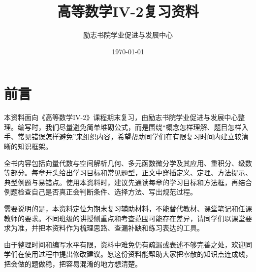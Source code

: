 \documentclass[a4paper,10pt]{ctexart}
\begin{document}

\title{高等数学IV-2复习资料}
\author{励志书院\quad 学业促进与发展中心}
\date{\today}
\maketitle

\tableofcontents

\newpage
\section*{\huge\textbf{前言}}

本资料面向《高等数学IV-2》课程期末复习，由励志书院学业促进与发展中心整理。编写时，我们尽量避免简单堆砌公式，而是围绕“概念怎样理解、题目怎样入手、常见错误怎样避免”来组织内容，希望帮助同学们在有限复习时间内建立较清晰的知识框架。

全书内容包括向量代数与空间解析几何、多元函数微分学及其应用、重积分、级数等部分。每章开头给出学习目标和常见题型，正文中穿插定义、定理、方法提示、典型例题与易错点。使用本资料时，建议先通读每章的学习目标和方法框，再结合例题检查自己是否真正会判断条件、选择方法、写出规范过程。

需要说明的是，本资料定位为期末复习辅助材料，不能替代教材、课堂笔记和任课教师的要求。不同班级的讲授侧重点和考查范围可能存在差异，请同学们以课堂要求为准，并把本资料作为梳理思路、查漏补缺和练习表达的工具。

由于整理时间和编写水平有限，资料中难免仍有疏漏或表述不够完善之处，欢迎同学们在使用过程中提出修改建议。愿这份资料能帮助大家把零散的知识点连成线，把会做的题做稳，把容易混淆的地方想清楚。






\end{document}
